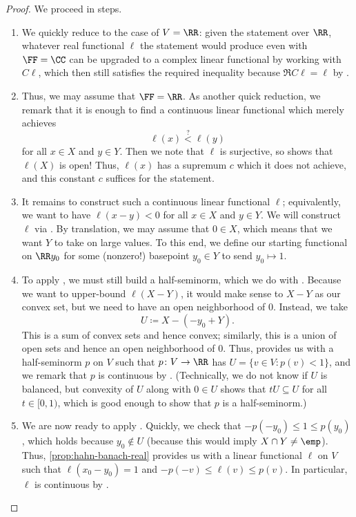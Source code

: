 \documentclass[notes.tex]{subfiles}
\begin{document}
\begin{proof}
	We proceed in steps.
	\begin{enumerate}
		\item We quickly reduce to the case of $V=\RR$: given the statement over $\RR$, whatever real functional $\ell$ the statement would produce even with $\FF=\CC$ can be upgraded to a complex linear functional by working with $C\ell$, which then still satisfies the required inequality because $\Re C\ell=\ell$ by .

		\item Thus, we may assume that $\FF=\RR$. As another quick reduction, we remark that it is enough to find a continuous linear functional which merely achieves
		\[\ell(x)\stackrel?<\ell(y)\]
		for all $x\in X$ and $y\in Y$. Then we note that $\ell$ is surjective, so  shows that $\ell(X)$ is open! Thus, $\ell(x)$ has a supremum $c$ which it does not achieve, and this constant $c$ suffices for the statement.

		\item It remains to construct such a continuous linear functional $\ell$; equivalently, we want to have $\ell(x-y)<0$ for all $x\in X$ and $y\in Y$. We will construct $\ell$ via . By translation, we may assume that $0\in X$, which means that we want $Y$ to take on large values. To this end, we define our starting functional on $\RR y_0$ for some (nonzero!) basepoint $y_0\in Y$ to send $y_0\mapsto1$.

		\item To apply , we must still build a half-seminorm, which we do with . Because we want to upper-bound $\ell(X-Y)$, it would make sense to $X-Y$ as our convex set, but we need to have an open neighborhood of $0$. Instead, we take
		\[U\coloneqq X-(-y_0+Y).\]
		This is a sum of convex sets and hence convex; similarly, this is a union of open sets and hence an open neighborhood of $0$. Thus,  provides us with a half-seminorm $p$ on $V$ such that $p\colon V\to\RR$ has $U=\{v\in V:p(v)<1\}$, and we remark that $p$ is continuous by . (Technically, we do not know if $U$ is balanced, but convexity of $U$ along with $0\in U$ shows that $tU\subseteq U$ for all $t\in[0,1)$, which is good enough to show that $p$ is a half-seminorm.)

		\item We are now ready to apply . Quickly, we check that $-p(-y_0)\le1\le p(y_0)$, which holds because $y_0\notin U$ (because this would imply $X\cap Y\ne\emp$). Thus, \cref{prop:hahn-banach-real} provides us with a linear functional $\ell$ on $V$ such that $\ell(x_0-y_0)=1$ and $-p(-v)\le\ell(v)\le p(v)$. In particular, $\ell$ is continuous by .


\end{enumerate}
\end{proof}
\end{document}

